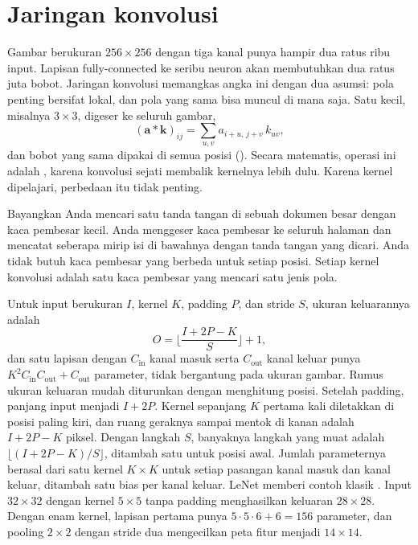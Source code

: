 \section{Jaringan konvolusi}

Gambar berukuran $256\times256$ dengan tiga kanal punya hampir dua ratus ribu input. Lapisan
fully-connected ke seribu neuron akan membutuhkan dua ratus juta bobot. Jaringan konvolusi
memangkas angka ini dengan dua asumsi: pola penting bersifat lokal, dan pola yang sama bisa
muncul di mana saja. Satu  kecil, misalnya $3\times3$, digeser ke seluruh gambar,
\begin{equation}
(\bm a\ast\bm k)_{ij}=\sum_{u,v}a_{i+u,\,j+v}\,k_{uv},
\end{equation}
dan bobot yang sama dipakai di semua posisi (). Secara matematis, operasi
ini adalah , karena konvolusi sejati membalik kernelnya lebih dulu.
Karena kernel dipelajari, perbedaan itu tidak penting.

Bayangkan Anda mencari satu tanda tangan di sebuah dokumen besar dengan kaca pembesar kecil.
Anda menggeser kaca pembesar ke seluruh halaman dan mencatat seberapa mirip isi di bawahnya
dengan tanda tangan yang dicari. Anda tidak butuh kaca pembesar yang berbeda untuk setiap posisi.
Setiap kernel konvolusi adalah satu kaca pembesar yang mencari satu jenis pola.

Untuk input berukuran $I$, kernel $K$, padding $P$, dan stride $S$, ukuran keluarannya adalah
\begin{equation}
O=\Big\lfloor\frac{I+2P-K}{S}\Big\rfloor+1,
\end{equation}
dan satu lapisan dengan $C_{\mathrm{in}}$ kanal masuk serta $C_{\mathrm{out}}$ kanal keluar punya
$K^2C_{\mathrm{in}}C_{\mathrm{out}}+C_{\mathrm{out}}$ parameter, tidak bergantung pada ukuran gambar.
Rumus ukuran keluaran mudah diturunkan dengan menghitung posisi. Setelah padding, panjang input
menjadi $I+2P$. Kernel sepanjang $K$ pertama kali diletakkan di posisi paling kiri, dan ruang geraknya
sampai mentok di kanan adalah $I+2P-K$ piksel. Dengan langkah $S$, banyaknya langkah yang muat adalah
$\lfloor(I+2P-K)/S\rfloor$, ditambah satu untuk posisi awal. Jumlah parameternya berasal dari satu
kernel $K\times K$ untuk setiap pasangan kanal masuk dan kanal keluar, ditambah satu bias per kanal
keluar.
LeNet memberi contoh klasik \citep{lecun1998}. Input $32\times32$ dengan kernel $5\times5$ tanpa
padding menghasilkan keluaran $28\times28$. Dengan enam kernel, lapisan pertama punya
$5\cdot5\cdot6+6=156$ parameter, dan pooling $2\times2$ dengan stride dua mengecilkan peta fitur
menjadi $14\times14$.

